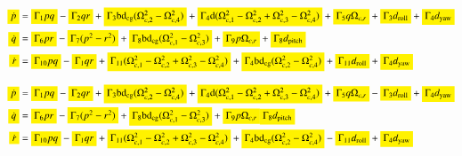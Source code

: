 \documentclass[3p]{elsarticle}
\begin{document}
\begin{align}
    \colorbox{yellow}{$\dot{p}$} &= \colorbox{yellow}{$\Gamma_1 pq$} - \colorbox{yellow}{$\Gamma_2 qr$} + \colorbox{yellow}{$\Gamma_3 \mathrm{b}\mathrm{d}_{\text{cg}} (\Omega_{c, 2}^2 - \Omega_{c, 4}^2)$} + \colorbox{yellow}{$\Gamma_4 \mathrm{d} (\Omega_{c, 1}^2 - \Omega_{c, 2}^2 + \Omega_{c, 3}^2 - \Omega_{c, 4}^2)$} + \colorbox{yellow}{$\Gamma_5 q \Omega_{c, r}$} + \colorbox{yellow}{$\Gamma_3 d_{\text{roll}}$} + \colorbox{yellow}{$\Gamma_4 d_{\text{yaw}}$} \\
    \colorbox{yellow}{$\dot{q}$} &= \colorbox{yellow}{$\Gamma_6 pr$} - \colorbox{yellow}{$\Gamma_7 (p^2 - r^2)$} + \colorbox{yellow}{$\Gamma_8 \mathrm{b}\mathrm{d}_{\text{cg}}(\Omega_{c, 1}^2 - \Omega_{c, 3}^2)$} + \colorbox{yellow}{$\Gamma_9 p \Omega_{c, r}$} + \colorbox{yellow}{$\Gamma_8 d_{\text{pitch}}$} \\
    \colorbox{yellow}{$\dot{r}$} &= \colorbox{yellow}{$\Gamma_{10} pq$} - \colorbox{yellow}{$\Gamma_{1} qr$} + \colorbox{yellow}{$\Gamma_{11} (\Omega_{c, 1}^2 - \Omega_{c, 2}^2 + \Omega_{c, 3}^2 - \Omega_{c, 4}^2)$} + \colorbox{yellow}{$\Gamma_{4} \mathrm{b}\mathrm{d}_{\text{cg}} (\Omega_{c, 2}^2 - \Omega_{c, 4}^2)$} + \colorbox{yellow}{$\Gamma_{11} d_{\text{roll}}$} + \colorbox{yellow}{$\Gamma_{4} d_{\text{yaw}}$}
\end{align}

\begin{align}
    \colorbox{yellow}{$\dot{p}$} &= \colorbox{yellow}{$\Gamma_1 pq$} - \colorbox{yellow}{$\Gamma_2 qr$} + \colorbox{yellow}{$\Gamma_3 \mathrm{b}\mathrm{d}_{\text{cg}} (\Omega_{c, 2}^2 - \Omega_{c, 4}^2)$} + \colorbox{yellow}{$\Gamma_4 \mathrm{d} (\Omega_{c, 1}^2 - \Omega_{c, 2}^2 + \Omega_{c, 3}^2 - \Omega_{c, 4}^2)$} + \colorbox{yellow}{$\Gamma_5 q \Omega_{c, r}$} - \colorbox{yellow}{$\Gamma_3 d_{\text{roll}}$} + \colorbox{yellow}{$\Gamma_4 d_{\text{yaw}}$} \\
    \colorbox{yellow}{$\dot{q}$} &= \colorbox{yellow}{$\Gamma_6 pr$} - \colorbox{yellow}{$\Gamma_7 (p^2 - r^2)$} + \colorbox{yellow}{$\Gamma_8 \mathrm{b}\mathrm{d}_{\text{cg}}(\Omega_{c, 1}^2 - \Omega_{c, 3}^2)$} + \colorbox{yellow}{$\Gamma_9 p \Omega_{c, r}$} \colorbox{yellow}{$\Gamma_8 d_{\text{pitch}}$}  \\
    \colorbox{yellow}{$\dot{r}$} &= \colorbox{yellow}{$\Gamma_{10} pq$} - \colorbox{yellow}{$\Gamma_{1} qr$} + \colorbox{yellow}{$\Gamma_{11} (\Omega_{c, 1}^2 - \Omega_{c, 2}^2 + \Omega_{c, 3}^2 - \Omega_{c, 4}^2)$} + \colorbox{yellow}{$\Gamma_{4} \mathrm{b}\mathrm{d}_{\text{cg}} (\Omega_{c, 2}^2 - \Omega_{c, 4}^2)$} - \colorbox{yellow}{$\Gamma_{11} d_{\text{roll}}$} + \colorbox{yellow}{$\Gamma_{4} d_{\text{yaw}}$}
\end{align}
\end{document}
